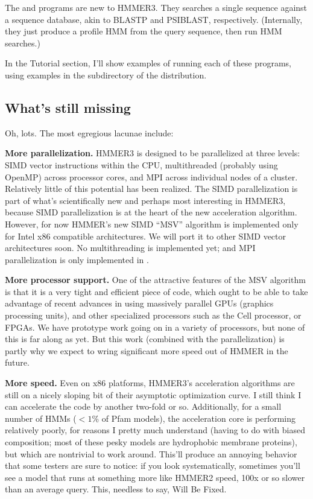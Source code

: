 The  and  programs are new to
HMMER3. They searches a single sequence against a sequence database,
akin to BLASTP and PSIBLAST, respectively. (Internally, they just
produce a profile HMM from the query sequence, then run HMM searches.)

In the Tutorial section, I'll show examples of running each of these
programs, using examples in the  subdirectory of the
distribution.


\subsection{What's still missing}

Oh, lots. The most egregious lacunae include:

\textbf{More parallelization.} HMMER3 is designed to be parallelized
at three levels: SIMD vector instructions within the CPU,
multithreaded (probably using OpenMP) across processor cores, and MPI
across individual nodes of a cluster. Relatively little of this
potential has been realized. The SIMD parallelization is part of
what's scientifically new and perhaps most interesting in HMMER3,
because SIMD parallelization is at the heart of the new acceleration
algorithm. However, for now HMMER's new SIMD ``MSV'' algorithm is
implemented only for Intel x86 compatible architectures. We will port
it to other SIMD vector architectures soon. No multithreading is
implemented yet; and MPI parallelization is only implemented in
.

\textbf{More processor support.} One of the attractive features of the
MSV algorithm is that it is a very tight and efficient piece of code,
which ought to be able to take advantage of recent advances in using
massively parallel GPUs (graphics processing units), and other
specialized processors such as the Cell processor, or FPGAs. We have
prototype work going on in a variety of processors, but none of this
is far along as yet. But this work (combined with the parallelization)
is partly why we expect to wring significant more speed out of HMMER
in the future.

\textbf{More speed.} Even on x86 platforms, HMMER3's acceleration
algorithms are still on a nicely sloping bit of their asymptotic
optimization curve. I still think I can accelerate the code by another
two-fold or so. Additionally, for a small number of HMMs ($<1$\% of
Pfam models), the acceleration core is performing relatively poorly,
for reasons I pretty much understand (having to do with biased
composition; most of these pesky models are hydrophobic membrane
proteins), but which are nontrivial to work around. This'll produce an
annoying behavior that some testers are sure to notice: if you look
systematically, sometimes you'll see a model that runs at something
more like HMMER2 speed, 100x or so slower than an average query. This,
needless to say, Will Be Fixed.

